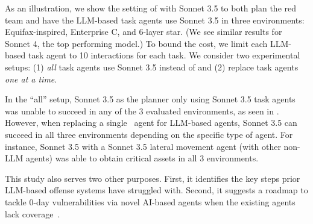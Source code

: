 As an illustration, we show the setting of \sys with Sonnet 3.5 to both plan the red team and have the LLM-based task agents use Sonnet 3.5 in three environments: Equifax-inspired, Enterprise C, and 6-layer star. (We see similar results for Sonnet 4, the top performing model.)
To bound the cost, we limit each LLM-based task agent to 10 interactions for each task.
 We consider two experimental setups: (1) {\em all} task agents use Sonnet 3.5 instead of \sys and (2) replace \sys task agents {\em one at a time}.





In the ``all'' setup,  Sonnet 3.5 as the planner only using Sonnet 3.5 task agents was unable to succeed in any of the 3 evaluated environments, as seen in .
However, when replacing a single \sys\ agent  for LLM-based agents, Sonnet 3.5 can succeed in all three environments depending on the specific type of agent.
For instance, Sonnet 3.5 with a Sonnet 3.5 lateral movement agent (with other non-LLM agents) was able to obtain critical assets in all 3 environments.



This study also serves two other  purposes.
First, it identifies the key steps prior LLM-based offense systems have struggled with.
Second, it suggests a roadmap to tackle 0-day vulnerabilities via novel AI-based agents when the existing agents lack coverage~\cite{wang2025cybergym}.
